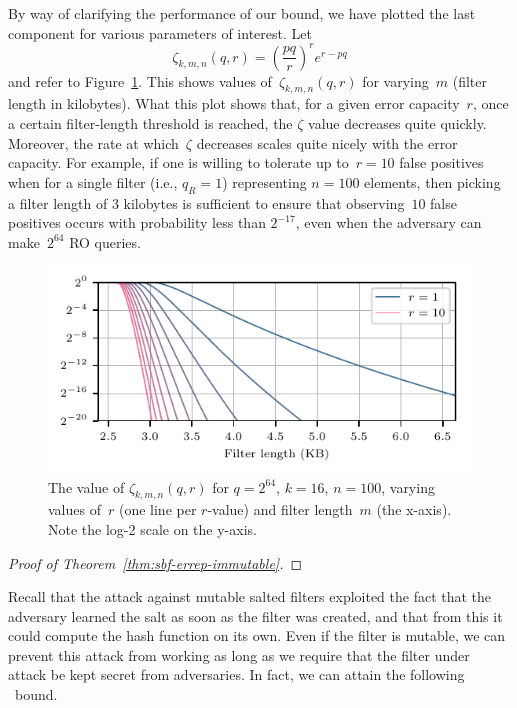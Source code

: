 By way of clarifying the performance of our bound, we have plotted the last
component for various parameters of interest. Let
%
\begin{equation}
  \zeta_{k,m,n}(q,r) = \left(\frac{pq}{r}\right)^re^{r-pq}
\end{equation}
%
and refer to Figure~\ref{fig:bf-bound}. This shows values
of~$\zeta_{k,m,n}(q,r)$ for varying~$m$ (filter length in kilobytes). What this
plot shows that, for a given error capacity~$r$, once a certain filter-length
threshold is reached, the $\zeta$ value decreases quite quickly. Moreover, the
rate at which~$\zeta$ decreases scales quite nicely with the error capacity. For
example, if one is willing to tolerate up to~$r=10$ false positives when for a
single filter (i.e., $q_R=1$) representing $n=100$ elements, then picking a
filter length of $3$ kilobytes is sufficient to ensure that observing~$10$ false
positives occurs with probability less than $2^{-17}$, even when the adversary
can make~$2^{64}$ RO queries.


\begin{figure}
  \hspace*{-10pt}
  \includegraphics{fig/bf-bound}
  \vspace{-24pt}
  \caption{
    The value of $\zeta_{k,m,n}(q,r)$ for $q=2^{64}$, $k=16$, $n=100$, varying
    values of~$r$ (one line per $r$-value) and filter length~$m$ (the x-axis).
    Note the log-2 scale on the y-axis.
  }
  \label{fig:bf-bound}
\end{figure}

\begin{proof}[Proof of Theorem~\ref{thm:sbf-errep-immutable}]
  
\end{proof}


Recall that the attack against mutable salted filters exploited the fact that
the adversary learned the salt as soon as the filter was created, and that from
this it could compute the hash function on its own. Even if the filter is
mutable, we can prevent this attack from working as long as we require that the
filter under attack be kept secret from adversaries. In fact, we can attain the
following \erreps\ bound.


